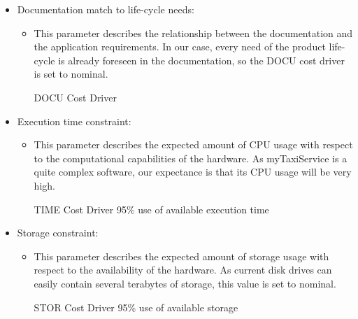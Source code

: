 \begin{itemize}
	\item Documentation match to life-cycle needs: 
	\begin{itemize}
	\item[] This parameter describes the relationship between the  documentation and the application requirements. In our case, every need of the product life-cycle is already foreseen in the documentation, so the DOCU cost driver is set to nominal.
	\begin{costdriverstable}{DOCU Cost Driver}
		\hline
	\end{costdriverstable}
	\end{itemize}
\end{itemize}

\begin{itemize}
	\item Execution time constraint: 
	\begin{itemize}
	\item[] This parameter describes the expected amount of CPU usage with respect to the computational capabilities of the hardware. As myTaxiService is a quite complex software, our expectance is that its CPU usage will be very high.
	\begin{costdriverstable}{TIME Cost Driver}
		 {95\% use of available execution time}\hline
	\end{costdriverstable}
	\end{itemize}
\end{itemize}

\begin{itemize}
	\item Storage constraint: 
	\begin{itemize}
	\item[] This parameter describes the expected amount of storage usage with respect to the availability of the hardware. As current disk drives can easily contain several terabytes of storage, this value is set to nominal.
	\begin{costdriverstable}{STOR Cost Driver}
		 {95\% use of available storage}\hline
	\end{costdriverstable}
	\end{itemize}
\end{itemize}

